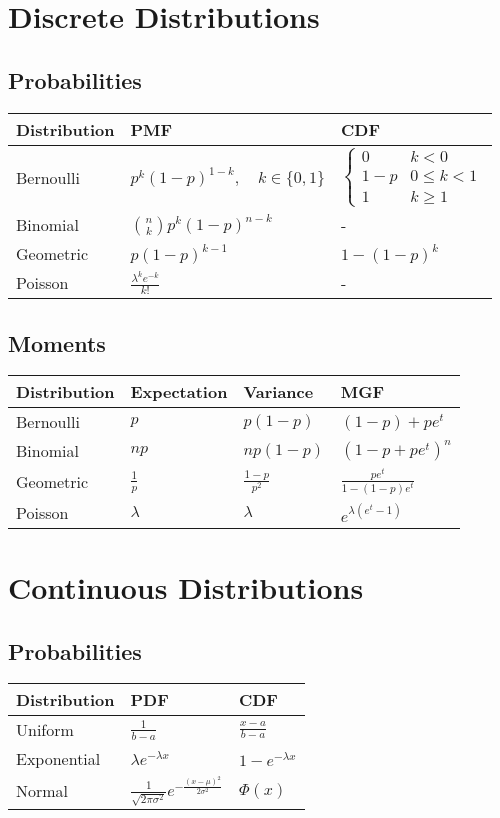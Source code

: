


\section*{Discrete Distributions}
\subsection*{Probabilities}
\begin{center}
  \begin{tabularx}{\textwidth}{XXX}
	\toprule
	Distribution & PMF & CDF\\
	\midrule
	Bernoulli & $p^k (1-p)^{1-k}, \quad k\in\{0, 1\}$ & $\begin{cases} 0 & k < 0 \\ 1 - p & 0 \leq k < 1 \\ 1 & k \geq 1 \end{cases}$\\
	Binomial & $ {n \choose k} p^k (1-p)^{n-k} $ & - \\
	Geometric & $ p(1-p)^{k-1}$ & $1 - (1 - p)^k$\\
	Poisson & $\frac{\lambda^ke^{-k}}{k!}$ & -
  \end{tabularx}
\end{center}

\subsection*{Moments}
\begin{center}
  \begin{tabularx}{\textwidth}{XXXX}
	\toprule
	Distribution & Expectation & Variance & MGF\\
	\midrule
	Bernoulli & $p$ & $p(1-p)$ & $(1-p) + pe^t$\\
	Binomial & $np$ & $np(1-p)$ & $(1-p + pe^t)^n$\\
	Geometric & $\frac{1}{p}$ & $\frac{1-p}{p^2}$ & $\frac{pe^t}{1-(1-p)e^t}$\\
	Poisson & $\lambda$ & $\lambda$ & $e^{\lambda(e^t - 1)}$
  \end{tabularx}
\end{center}

\section*{Continuous Distributions}
\subsection*{Probabilities}
\begin{center}
  \begin{tabularx}{\textwidth}{XXX}
	\toprule
	Distribution & PDF & CDF\\
	\midrule
	Uniform & $\frac{1}{b-a}$ & $\frac{x-a}{b-a}$\\
	Exponential & $\lambda e^{-\lambda x}$ & $1 - e^{-\lambda x}$\\
	Normal & $\frac{1}{\sqrt{2\pi\sigma^2}} e^{-\frac{(x-\mu)^2}{2\sigma^2}}$ & $\Phi(x)$\\
  \end{tabularx}
\end{center}

